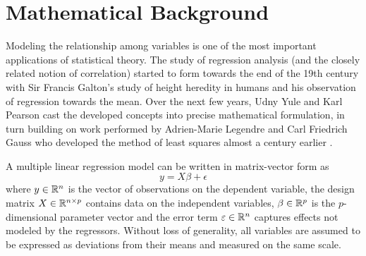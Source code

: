 \chapter{Mathematical Background}

Modeling the relationship among variables is one of the most important applications of statistical theory. The study of regression analysis (and the closely related notion of correlation) started to form towards the end of the 19th century with Sir Francis Galton's study of height heredity in humans and his observation of regression towards the mean. Over the next few years, Udny Yule and Karl Pearson cast the developed concepts into precise mathematical formulation, in turn building on work performed by Adrien-Marie Legendre and Carl Friedrich Gauss who developed the method of least squares almost a century earlier \citep{Allen1997}.

A multiple linear regression model can be written in matrix-vector form as
\begin{equation}
  y = X \beta + \epsilon
\end{equation}
where $y \in \mathbb{R}^n$ is the vector of observations on the dependent variable, the design matrix $X \in \mathbb{R}^{n \times p}$ contains data on the independent variables, $\beta \in \mathbb{R}^p$ is the $p$-dimensional parameter vector and the error term $\varepsilon \in \mathbb{R}^n$ captures effects not modeled by the regressors. Without loss of generality, all variables are assumed to be expressed as deviations from their means and measured on the same scale.

